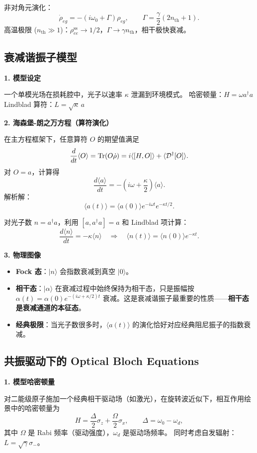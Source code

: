 非对角元演化：
\[
\dot{\rho}_{eg} = -(i\omega_0 + \Gamma)\rho_{eg}, \qquad
\Gamma = \frac{\gamma}{2}(2n_{\text{th}}+1).
\]
高温极限 ($n_{\text{th}}\gg 1$)：$\rho_{ee}^{\text{ss}}\to 1/2$，$\Gamma\to\gamma n_{\text{th}}$，相干极快衰减。

\subsection{衰减谐振子模型}

\textbf{1. 模型设定}

一个单模光场在损耗腔中，光子以速率 $\kappa$ 泄漏到环境模式。
哈密顿量：$H = \omega a^\dagger a$
Lindblad 算符：$L = \sqrt{\kappa}\,a$

\textbf{2. 海森堡-朗之万方程（算符演化）}

在主方程框架下，任意算符 $O$ 的期望值满足
\[
\frac{d}{dt}\langle O\rangle = \Tr(O\dot{\rho}) = i\langle[H,O]\rangle + \langle\mathcal{D}^\dagger[O]\rangle.
\]
对 $O=a$，计算得
\[
\frac{d\langle a\rangle}{dt} = -(i\omega + \frac{\kappa}{2})\langle a\rangle.
\]
解析解：
\[
\boxed{\langle a(t)\rangle = \langle a(0)\rangle e^{-i\omega t}e^{-\kappa t/2}}.
\]

对光子数 $n=a^\dagger a$，利用 $[a, a^\dagger a]=a$ 和 Lindblad 项计算：
\[
\frac{d\langle n\rangle}{dt} = -\kappa\langle n\rangle
\quad\Longrightarrow\quad
\boxed{\langle n(t)\rangle = \langle n(0)\rangle e^{-\kappa t}}.
\]

\textbf{3. 物理图像}

\begin{itemize}[nosep]
    \item \textbf{Fock 态}：$|n\rangle$ 会指数衰减到真空 $|0\rangle$。
    \item \textbf{相干态}：$|\alpha\rangle$ 在衰减过程中始终保持为相干态，只是振幅按 $\alpha(t)=\alpha(0)e^{-(i\omega+\kappa/2)t}$ 衰减。这是衰减谐振子最重要的性质——\textbf{相干态是衰减通道的本征态}。
    \item \textbf{经典极限}：当光子数很多时，$\langle a(t)\rangle$ 的演化恰好对应经典阻尼振子的指数衰减。
\end{itemize}

\subsection{共振驱动下的 Optical Bloch Equations}

\textbf{1. 模型哈密顿量}

对二能级原子施加一个经典相干驱动场（如激光），在旋转波近似下，相互作用绘景中的哈密顿量为
\[
H = \frac{\Delta}{2}\sigma_z + \frac{\Omega}{2}\sigma_x,
\qquad \Delta = \omega_0 - \omega_d,
\]
其中 $\Omega$ 是 Rabi 频率（驱动强度），$\omega_d$ 是驱动场频率。
同时考虑自发辐射：$L=\sqrt{\gamma}\sigma_-$。

